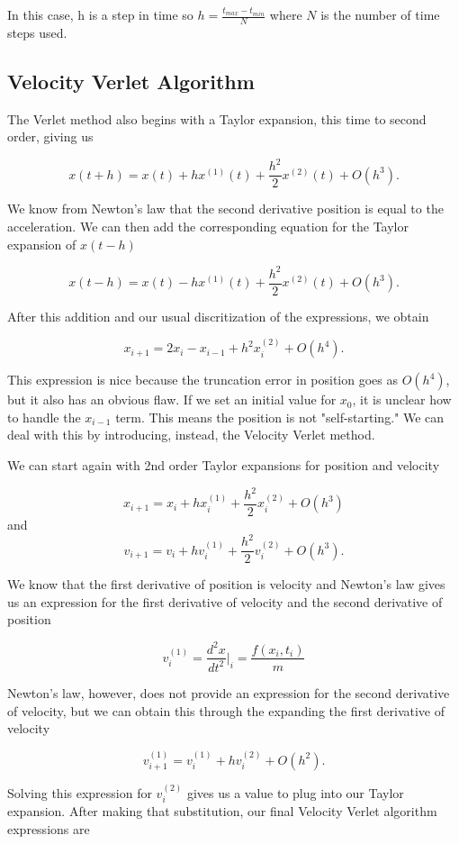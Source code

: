 \documentclass[%
oneside,                 %
final,                   %
10pt]{article}
\begin{document}
In this case, h is a step in time so $h=\frac{t_{max}-t_{min}}{N}$ where $N$ is the number of time steps used.

\subsection{Velocity Verlet Algorithm}

The Verlet method also begins with a Taylor expansion, this time to second order, giving us

\[
x(t+h) = x(t)+hx^{(1)}(t)+\frac{h^2}{2}x^{(2)}(t) + O(h^3).
\]

We know from Newton's law that the second derivative position is equal to the acceleration.  We can then add the corresponding equation for the Taylor expansion of $x(t-h)$

\[
x(t-h) = x(t)-hx^{(1)}(t)+\frac{h^2}{2}x^{(2)}(t) + O(h^3).
\]

After this addition and our usual discritization of the expressions, we obtain

\[
x_{i+1}=2x_i -x_{i-1}+h^2x_i^{(2)}+O(h^4).
\]

This expression is nice because the truncation error in position goes as $O(h^4)$, but it also has an obvious flaw.  If we set an initial value for $x_0$, it is unclear how to handle the $x_{i-1}$ term.  This means the position is not "self-starting."  We can deal with this by introducing, instead, the Velocity Verlet method.

We can start again with 2nd order Taylor expansions for position and velocity

\[
x_{i+1} =x_i +hx_i^{(1)}+\frac{h^2}{2}x_i^{(2)}+O(h^3)
\]
and
\[
v_{i+1} =v_i +hv_i^{(1)}+\frac{h^2}{2}v_i^{(2)}+O(h^3).
\]

We know that the first derivative of position is velocity and Newton's law gives us an expression for the first derivative of velocity and the second derivative of position

\[
v_i^{(1)}=\frac{d^2x}{dt^2}|_i=\frac{f(x_i,t_i)}{m}
\]

Newton's law, however, does not provide an expression for the second derivative of velocity, but we can obtain this through the expanding the first derivative of velocity

\[
v_{i+1}^{(1)}=v_i^{(1)} + hv_i^{(2)}+O(h^2).
\]

Solving this expression for $v_i^{(2)}$ gives us a value to plug into our Taylor expansion.  After making that substitution, our final Velocity Verlet algorithm expressions are
\end{document}
